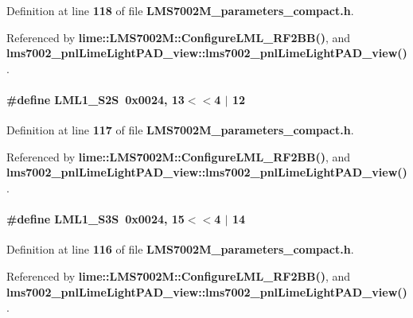 Definition at line {\bf 118} of file {\bf L\+M\+S7002\+M\+\_\+parameters\+\_\+compact.\+h}.



Referenced by {\bf lime\+::\+L\+M\+S7002\+M\+::\+Configure\+L\+M\+L\+\_\+\+R\+F2\+B\+B()}, and {\bf lms7002\+\_\+pnl\+Lime\+Light\+P\+A\+D\+\_\+view\+::lms7002\+\_\+pnl\+Lime\+Light\+P\+A\+D\+\_\+view()}.

\paragraph[{L\+M\+L1\+\_\+\+S2S}]{\setlength{\rightskip}{0pt plus 5cm}\#define L\+M\+L1\+\_\+\+S2S~0x0024, 13$<$$<$4 $\vert$  12}\label{LMS7002M__parameters__compact_8h_a88086ac9daa55c628be6ba97266b0fda}


Definition at line {\bf 117} of file {\bf L\+M\+S7002\+M\+\_\+parameters\+\_\+compact.\+h}.



Referenced by {\bf lime\+::\+L\+M\+S7002\+M\+::\+Configure\+L\+M\+L\+\_\+\+R\+F2\+B\+B()}, and {\bf lms7002\+\_\+pnl\+Lime\+Light\+P\+A\+D\+\_\+view\+::lms7002\+\_\+pnl\+Lime\+Light\+P\+A\+D\+\_\+view()}.

\paragraph[{L\+M\+L1\+\_\+\+S3S}]{\setlength{\rightskip}{0pt plus 5cm}\#define L\+M\+L1\+\_\+\+S3S~0x0024, 15$<$$<$4 $\vert$  14}\label{LMS7002M__parameters__compact_8h_a5643d3c1b716e16ef43f980335cbcdbd}


Definition at line {\bf 116} of file {\bf L\+M\+S7002\+M\+\_\+parameters\+\_\+compact.\+h}.



Referenced by {\bf lime\+::\+L\+M\+S7002\+M\+::\+Configure\+L\+M\+L\+\_\+\+R\+F2\+B\+B()}, and {\bf lms7002\+\_\+pnl\+Lime\+Light\+P\+A\+D\+\_\+view\+::lms7002\+\_\+pnl\+Lime\+Light\+P\+A\+D\+\_\+view()}.

